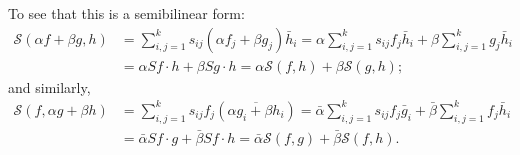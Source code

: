 \documentclass[11pt, oneside, a4paper]{article}
\begin{document}
To see that this is a semibilinear form:
\begin{align*}
    \mathcal{S}(\alpha f+\beta g, h)
    &= \sum_{i,j=1}^k s_{ij}(\alpha f_j + \beta g_j)\bar{h}_i
    = \alpha \sum_{i,j=1}^k s_{ij}f_j\bar{h}_i + \beta \sum_{i,j=1}^k g_j\bar{h}_i\\
    &= \alpha Sf\cdot h + \beta Sg\cdot h
    = \alpha\mathcal{S}(f,h) + \beta\mathcal{S}(g,h);
\end{align*}
and similarly,
\begin{align*}
    \mathcal{S}(f, \alpha g + \beta h)
    &= \sum_{i,j=1}^k s_{ij}f_j(\overline{\alpha g_i + \beta h_i})
    = \bar{\alpha}\sum_{i,j=1}^k s_{ij}f_j\bar{g}_i + \bar{\beta}\sum_{i,j=1}^k f_j \bar{h}_i\\
    &= \bar{\alpha}Sf\cdot g + \bar{\beta}Sf\cdot h
    = \bar{\alpha}\mathcal{S}(f,g) + \bar{\beta}\mathcal{S}(f,h).
\end{align*}
\end{document}
